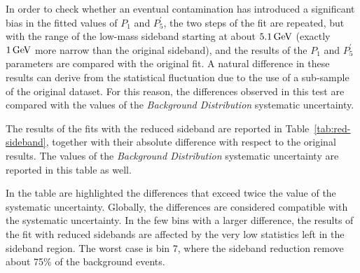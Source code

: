In order to check whether an eventual contamination has introduced a significant bias in the fitted values of $P_1$ and $P^\prime_5$, the two steps of the fit are repeated, but with the range of the low-mass sideband starting at about $5.1 \,\textrm{GeV}$ (exactly $1 \,\textrm{GeV}$ more narrow than the original sideband), and the results of the $P_1$ and $P^\prime_5$ parameters are compared with the original fit.
A natural difference in these results can derive from the statistical fluctuation due to the use of a sub-sample of the original dataset.
For this reason, the differences observed in this test are compared with the values of the \textit{Background Distribution} systematic uncertainty.

The results of the fits with the reduced sideband are reported in Table~\ref{tab:red-sideband}, together with their absolute difference with respect to the original results.
The values of the \textit{Background Distribution} systematic uncertainty are reported in this table as well.

In the table are highlighted the differences that exceed twice the value of the systematic uncertainty.
Globally, the differences are considered compatible with the systematic uncertainty.
In the few bins with a larger difference, the results of the fit with reduced sidebands are affected by the very low statistics left in the sideband region.
The worst case is bin 7, where the sideband reduction remove about 75\% of the background events.


